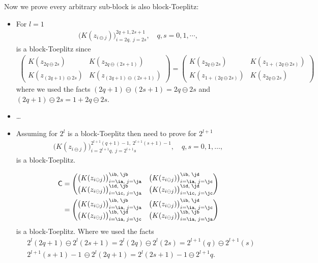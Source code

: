\documentclass{svjour3}                     %
\newcommand{\mC}{\mathsf{C}}
\begin{document}
\iffalse
Now we prove every arbitrary sub-block is also block-Toeplitz: 
\begin{itemize}
	\item For $l=1$
	\begin{align*}
	\bigl( K(z_{i \ominus j})\bigr)_{i=2q, \; j=2s}^{2q+1, 2s+1}, \quad q,s=0,1,\cdots,
	\end{align*}
	is a block-Toeplitz since
	\begin{align*}
	\begin{pmatrix}
	K(z_{2q \ominus 2s}) & K(z_{2q \ominus (2s +1)}) \\
	K(z_{(2q+1) \ominus 2s}) & K(z_{(2q+1) \ominus (2s +1)}) 
	\end{pmatrix}
	=
	\begin{pmatrix}
	K(z_{2q \ominus 2s}) & K(z_{1 + (2q \ominus 2s)}) \\
	K(z_{1 + (2q \ominus 2s)}) & K(z_{ 2q \ominus 2s}) 
	\end{pmatrix}
	\end{align*}
	where we used the facts $(2q+1) \ominus (2s+1) = 2q \ominus 2s$ and $(2q+1) \ominus 2s = 1 + 2q \ominus 2s$.
	
	\item \ldots
	
	\item Assuming for $2^{l}$ is a block-Toeplitz then need to prove for $2^{l+1}$ 
	\begin{align*}
	\bigl( K(z_{i \ominus j})\bigr)_{i=2^{l+1}q, \; j=2^{l+1}s}^{2^{l+1}(q+1)-1, \; 2^{l+1}(s+1)-1}, \quad q,s=0,1,\dots,
	\end{align*}
	is a block-Toeplitz.
	
	\begin{align*}
	\mC &=
	\begin{pmatrix}
	\bigl( K(z_{i \ominus j})\bigr)_{i=\ia, \; j=\ja }^{\ib, \; \jb} & \bigl( K(z_{i \ominus j})\bigr)_{i=\ia, \; j=\jc }^{\ib, \; \jd} \\
	\bigl( K(z_{i \ominus j})\bigr)_{i=\ic, \; j=\ja }^{\id, \; \jb} & \bigl( K(z_{i \ominus j})\bigr)_{i=\ic, \; j=\jc }^{\id, \; \jd}
	\end{pmatrix} \\
	& =
	\begin{pmatrix}
	\bigl( K(z_{i \ominus j})\bigr)_{i=\ia, \; j=\ja }^{\ib, \; \jb} & \bigl( K(z_{i \ominus j})\bigr)_{i=\ia, \; j=\jc }^{\ib, \; \jd} \\
	\bigl( K(z_{i \ominus j})\bigr)_{i=\ia, \; j=\jc }^{\ib, \; \jd} & \bigl( K(z_{i \ominus j})\bigr)_{i=\ia, \; j=\ja }^{\ib, \; \jb}
	\end{pmatrix}
	\end{align*}
	is a block-Toeplitz. Where we used the facts
	\begin{align*}
	& 2^{l}(2q+1) \ominus 2^{l}(2s+1) = 2^{l}(2q) \ominus 2^{l}(2s) = 2^{l+1}(q) \ominus 2^{l+1}(s) \\
	&2^{l+1}(s+1)-1 \, \ominus 2^{l}(2q + 1) %
	= 2^{l}(2s+1)-1 \ominus 2^{l+1}q.
	\end{align*}
	

\end{itemize}
\end{document}

